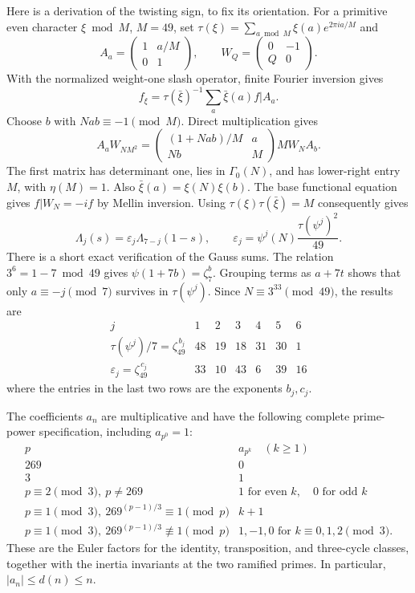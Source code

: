 \documentclass[11pt]{article}
\begin{document}
Here is a derivation of the twisting sign, to fix its orientation.
For a primitive even character $\xi\bmod M$, $M=49$, set
$\tau(\xi)=\sum_{a\bmod M}\xi(a)e^{2\pi ia/M}$ and
\[
 A_a=\begin{pmatrix}1&a/M\\0&1\end{pmatrix},\qquad
 W_Q=\begin{pmatrix}0&-1\\Q&0\end{pmatrix}.
\]
With the normalized weight-one slash operator, finite Fourier inversion gives
\[ f_\xi=\tau(\bar\xi)^{-1}\sum_a\bar\xi(a)f|A_a. \]
Choose $b$ with $Nab\equiv-1\pmod M$. Direct multiplication gives
\[
 A_aW_{NM^2}=
 \begin{pmatrix}(1+Nab)/M&a\\Nb&M\end{pmatrix}M W_NA_b.
 \tag{S9}\label{seven:fricke-matrix}
\]
The first matrix has determinant one, lies in $\Gamma_0(N)$, and has
lower-right entry $M$, with $\eta(M)=1$.
Also $\bar\xi(a)=\xi(N)\xi(b)$.
The base functional equation gives $f|W_N=-if$ by Mellin inversion.
Using $\tau(\xi)\tau(\bar\xi)=M$ consequently gives
\[
 \Lambda_j(s)=\varepsilon_j\Lambda_{7-j}(1-s),\qquad
 \varepsilon_j=\psi^j(N)\frac{\tau(\psi^j)^2}{49}.
 \tag{S10}\label{seven:epsilon}
\]
There is a short exact verification of the Gauss sums.
The relation $3^6=1-7\bmod49$ gives
$\psi(1+7b)=\zeta_7^b$. Grouping terms as $a+7t$ shows that only
$a\equiv-j\pmod7$ survives in $\tau(\psi^j)$.
Since $N\equiv3^{33}\pmod{49}$, the results are
\[
\begin{array}{c|rrrrrr}
 j&1&2&3&4&5&6\\ \hline
 \tau(\psi^j)/7=\zeta_{49}^{\,b_j}
   &48&19&18&31&30&1\\
 \varepsilon_j=\zeta_{49}^{\,c_j}
   &33&10&43&6&39&16
\end{array}
 \tag{S11}\label{seven:gauss-table}
\]
where the entries in the last two rows are the exponents $b_j,c_j$.

The coefficients $a_n$ are multiplicative and have the following complete
prime-power specification, including $a_{p^0}=1$:
\[
\begin{array}{c|l}
 p& a_{p^k}\quad(k\ge1)\\ \hline
269&0\\
3&1\\
p\equiv2\pmod3,\ p\ne269
   &1\text{ for even }k,\quad0\text{ for odd }k\\
p\equiv1\pmod3,\ 269^{(p-1)/3}\equiv1\pmod p&k+1\\
p\equiv1\pmod3,\ 269^{(p-1)/3}\not\equiv1\pmod p
   &1,-1,0\text{ for }k\equiv0,1,2\pmod3 .
\end{array}
 \tag{S12}\label{seven:coefficients}
\]
These are the Euler factors for the identity, transposition, and
three-cycle classes, together with the inertia invariants at the two
ramified primes. In particular, $|a_n|\le d(n)\le n$.
\end{document}
